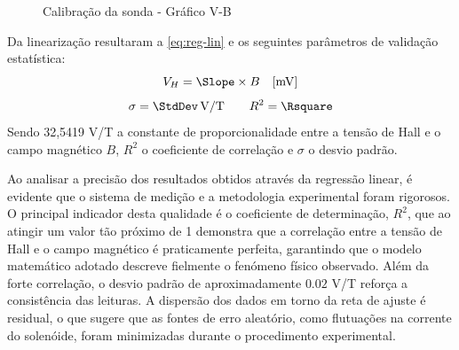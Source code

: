\begin{figure}[!ht]
	\centering
	\caption{Calibração da sonda - Gráfico V-B}
	\label{gra:mont1-alinA}
\end{figure}

Da linearização resultaram a \cref{eq:reg-lin} e os seguintes parâmetros de validação estatística:
\begin{equation}\label{eq:reg-lin}
	V_H = \Slope \times B \quad	[\unit{\milli\volt}]
\end{equation}
\begin{align*}
	\sigma = \StdDev \, \text{V/T}  \qquad R^2 = \Rsquare
\end{align*}
Sendo 32,5419 V/T a constante de proporcionalidade entre a tensão de Hall e o campo magnético $B$, $R^2$ o coeficiente de correlação e $\sigma$ o desvio padrão.

\vspace{1.5pt}
Ao analisar a precisão dos resultados obtidos através da regressão linear, é evidente que o sistema de medição e a metodologia experimental foram rigorosos. O principal indicador desta qualidade é o coeficiente de determinação, $R^2$, que ao atingir um valor tão próximo de 1 demonstra que a correlação entre a tensão de Hall e o campo magnético é praticamente perfeita, garantindo que o modelo matemático adotado descreve fielmente o fenómeno físico observado.
Além da forte correlação, o desvio padrão de aproximadamente $0.02$ V/T reforça a consistência das leituras. A dispersão dos dados em torno da reta de ajuste é residual, o que sugere que as fontes de erro aleatório, como flutuações na corrente do solenóide, foram minimizadas durante o procedimento experimental.

